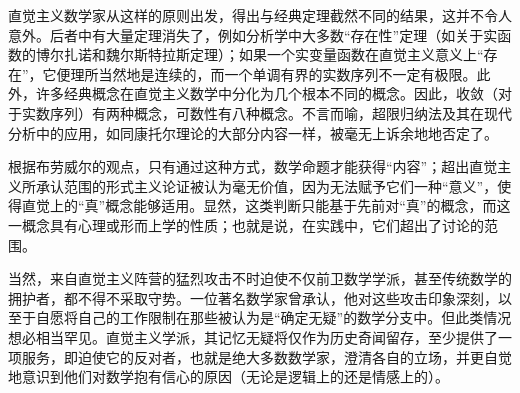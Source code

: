 直觉主义数学家从这样的原则出发，得出与经典定理截然不同的结果，这并不令人意外。后者中有大量定理消失了，例如分析学中大多数“存在性”定理（如关于实函数的博尔扎诺和魏尔斯特拉斯定理）；如果一个实变量函数在直觉主义意义上“存在”，它便理所当然地是连续的，而一个单调有界的实数序列不一定有极限。此外，许多经典概念在直觉主义数学中分化为几个根本不同的概念。因此，收敛（对于实数序列）有两种概念，可数性有八种概念。不言而喻，超限归纳法及其在现代分析中的应用，如同康托尔理论的大部分内容一样，被毫无上诉余地地否定了。

根据布劳威尔的观点，只有通过这种方式，数学命题才能获得“内容”；超出直觉主义所承认范围的形式主义论证被认为毫无价值，因为无法赋予它们一种“意义”，使得直觉上的“真”概念能够适用。显然，这类判断只能基于先前对“真”的概念，而这一概念具有心理或形而上学的性质；也就是说，在实践中，它们超出了讨论的范围。

当然，来自直觉主义阵营的猛烈攻击不时迫使不仅前卫数学学派，甚至传统数学的拥护者，都不得不采取守势。一位著名数学家曾承认，他对这些攻击印象深刻，以至于自愿将自己的工作限制在那些被认为是“确定无疑”的数学分支中。但此类情况想必相当罕见。直觉主义学派，其记忆无疑将仅作为历史奇闻留存，至少提供了一项服务，即迫使它的反对者，也就是绝大多数数学家，澄清各自的立场，并更自觉地意识到他们对数学抱有信心的原因（无论是逻辑上的还是情感上的）。


